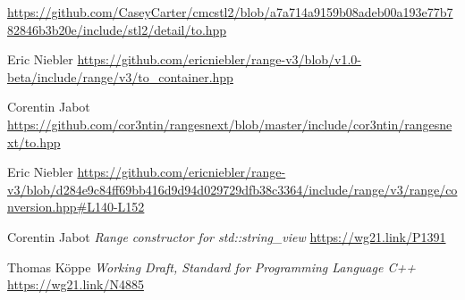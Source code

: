 \documentclass{wg21}
\begin{document}
\begin{thebibliography}{9}


	\url{https://github.com/CaseyCarter/cmcstl2/blob/a7a714a9159b08adeb00a193e77b782846b3b20e/include/stl2/detail/to.hpp}

    Eric Niebler
	\url{https://github.com/ericniebler/range-v3/blob/v1.0-beta/include/range/v3/to_container.hpp}

Corentin Jabot
\url{https://github.com/cor3ntin/rangesnext/blob/master/include/cor3ntin/rangesnext/to.hpp}

Eric Niebler
\url{https://github.com/ericniebler/range-v3/blob/d284e9c84ff69bb416d9d94d029729dfb38c3364/include/range/v3/range/conversion.hpp#L140-L152}

	Corentin Jabot
	\emph{Range constructor for std::string\_view}\newline
	\url{https://wg21.link/P1391}

Thomas Köppe
\emph{Working Draft, Standard for Programming Language C++}\newline
\url{https://wg21.link/N4885}


\end{thebibliography}
\end{document}
